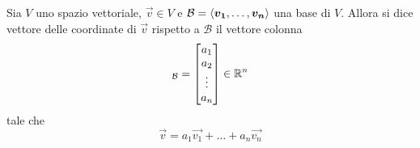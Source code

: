 \begin{definition}
    Sia $V$ uno spazio vettoriale, $\vec{v} \in V$ e $\mathcal{B} = \left\langle \bm{v_1}, \dots, \bm{v_n} \right\rangle$ una base di $V$. Allora si dice vettore delle coordinate di $\vec{v}$ rispetto a $\mathcal{B}$ il vettore colonna
    \begin{equation}
        [\vec{v}]_{\mathcal{B}} = \begin{bmatrix}
                                    a_1 \\
                                    a_2 \\
                                    \vdots \\
                                    a_n
                                 \end{bmatrix} \in \R^n
    \end{equation}
    tale che \begin{equation}
        \vec{v} = a_1\vec{v_1} + \dots + a_n\vec{v_n}
    \end{equation}
\end{definition}

